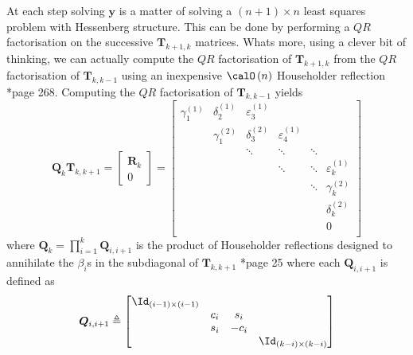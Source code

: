 At each step solving $\bm{y}$ is a matter of solving a $(n+1) \times n$ least squares problem with Hessenberg structure. This can be done by performing a $QR$ factorisation on the successive $\bm{T}_{k+1,k}$ matrices. Whats more, using a clever bit of thinking, we can actually compute the $QR$ factorisation of $\bm{T}_{k+1,k}$ from the $QR$ factorisation of $\bm{T}_{k,k-1}$ using an inexpensive $\calO \left( n \right)$ Householder reflection \cite{TrefethenLloydN.LloydNicholas1997Nla/}*{page 268}. Computing the $QR$ factorisation of $\bm{T}_{k,k-1}$ yields
\begin{equation}
    \bm{Q}_k \bm{T}_{k,k+1}
    =
    \begin{bmatrix}
        \bm{R}_k \\ 0
    \end{bmatrix}
    =
    \begin{bmatrix}
        \gamma_{1}^{(1)} & \delta_{2}^{(1)} & \varepsilon_{3}^{(1)} &                       &        &                       \\
                         & \gamma_{1}^{(2)} & \delta_{3}^{(2)}      & \varepsilon_{4}^{(1)} &        &                       \\
                         &                  & \ddots                & \ddots                & \ddots &                       \\
                         &                  &                       & \ddots                & \ddots & \varepsilon_{k}^{(1)} \\
                         &                  &                       &                       & \ddots & \gamma_{k}^{(2)}      \\
                         &                  &                       &                       &        & \delta_{k}^{(2)}      \\
                         &                  &                       &                       &        & 0                     \\
    \end{bmatrix}
\end{equation}
where $\bm{Q}_k = \prod_{i=1}^{k} \bm{Q}_{i,i+1}$ is the product of Householder reflections designed to annihilate the $\beta_i$s in the subdiagonal of $\bm{T}_{k,k+1}$ \cite{ChoiSou-ChengTerrya2007Imfs}*{page 25} where each $\bm{Q}_{i,i+1}$ is defined as
\begin{equation*}
    \bm{Q}_{i,i+1} \triangleq
    \begin{bmatrix}
        \Id_{(i-1) \times (i-1)} &       &        &                          \\
                                 & c_{i} & s_{i}  &                          \\
                                 & s_{i} & -c_{i} &                          \\
                                 &       &        & \Id_{(k-i) \times (k-i)}
    \end{bmatrix}
\end{equation*}
